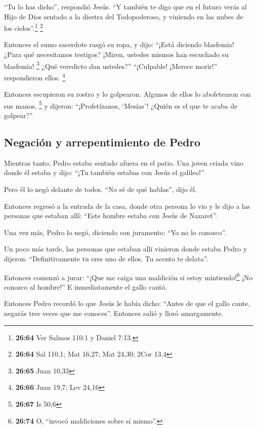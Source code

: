  ``Tu lo has dicho'', respondió Jesús. ``Y también te
digo que en el futuro verás al Hijo de Dios sentado a la diestra del
Todopoderoso, y viniendo en las nubes de los cielos''.\footnote{\textbf{26:64}
  Ver Salmos 110:1 y Daniel 7:13.} \footnote{\textbf{26:64} Sal 110,1;
  Mat 16,27; Mat 24,30; 2Cor 13,4}

 Entonces el sumo sacerdote rasgó su ropa, y dijo:
``¡Está diciendo blasfemia! ¿Para qué necesitamos testigos? ¡Miren,
ustedes mismos han escuchado su blasfemia! \footnote{\textbf{26:65} Juan
  10,33}  ¿Qué veredicto dan ustedes?'' ``¡Culpable!
¡Merece morir!'' respondieron ellos. \footnote{\textbf{26:66} Juan 19,7;
  Lev 24,16}

 Entonces escupieron su rostro y lo golpearon. Algunos de
ellos lo abofetearon con sus manos, \footnote{\textbf{26:67} Is 50,6}
 y dijeron: ``¡Profetízanos, `Mesías'! ¿Quién es el que
te acaba de golpear?''

\hypertarget{negaciuxf3n-y-arrepentimiento-de-pedro}{%
\subsection{Negación y arrepentimiento de
Pedro}\label{negaciuxf3n-y-arrepentimiento-de-pedro}}

 Mientras tanto, Pedro estaba sentado afuera en el patio.
Una joven criada vino donde él estaba y dijo: ``¡Tu también estabas con
Jesús el galileo!''

 Pero él lo negó delante de todos. ``No sé de qué
hablas'', dijo él.

 Entonces regresó a la entrada de la casa, donde otra
persona lo vio y le dijo a las personas que estaban allí: ``Este hombre
estaba con Jesús de Nazaret''.

 Una vez más, Pedro lo negó, diciendo con juramento: ``Yo
no lo conozco''.

 Un poco más tarde, las personas que estaban allí
vinieron donde estaba Pedro y dijeron: ``Definitivamente tu eres uno de
ellos. Tu acento te delata''.

 Entonces comenzó a jurar: ``¡Que me caiga una maldición
si estoy mintiendo!\footnote{\textbf{26:74} O, ``invocó maldiciones
  sobre sí mismo''.} ¡No conozco al hombre!'' E inmediatamente el gallo
cantó.

 Entonces Pedro recordó lo que Jesús le había dicho:
``Antes de que el gallo cante, negarás tres veces que me conoces''.
Entonces salió y lloró amargamente.

